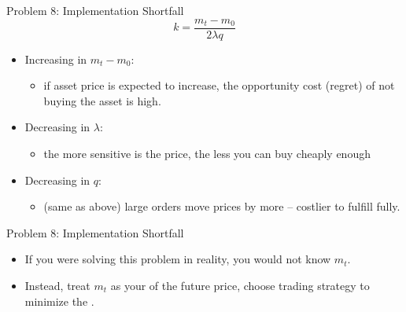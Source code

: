 \documentclass[english,10pt
,aspectratio=169
]{beamer}
\begin{document}
\begin{frame}{Problem 8: Implementation Shortfall}
	$$ k = \frac{m_t - m_0}{2\lambda q} $$
	\begin{itemize}
		\item Increasing in $m_t - m_0$:
		\begin{itemize}
			\item if asset price is expected to increase, the opportunity cost (regret) of not buying the asset is high.
		\end{itemize}
		\item Decreasing in $\lambda$:
		\begin{itemize}
			\item the more sensitive is the price, the less you can buy cheaply enough
		\end{itemize}
		\item Decreasing in $q$:
		\begin{itemize}
			\item (same as above) large orders move prices by more -- costlier to fulfill fully.
		\end{itemize}
	\end{itemize}
\end{frame}


\begin{frame}{Problem 8: Implementation Shortfall}
	\begin{itemize}
		\item If you were solving this problem in reality, you would not know $m_t$.
		\item Instead, treat $m_t$ as your  of the future price, choose trading strategy to minimize the .
	\end{itemize}
\end{frame}
\end{document}
